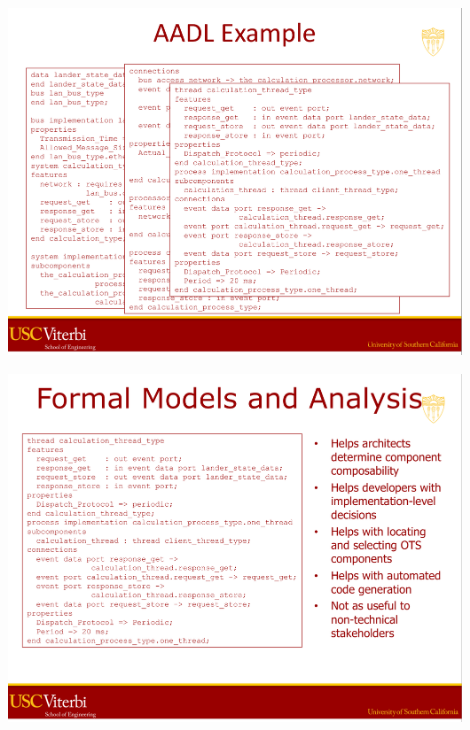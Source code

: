 \documentclass[xetex,mathserif,serif]{beamer}
\begin{document}
	\begin{frame}
		\begin{center}
			\includegraphics[width=0.9\textwidth]{medvidovic11.png}
		\end{center}
	\end{frame}

	\begin{frame}
		\begin{center}
			\includegraphics[width=0.9\textwidth]{medvidovic12.png}
		\end{center}
	\end{frame}
\end{document}
